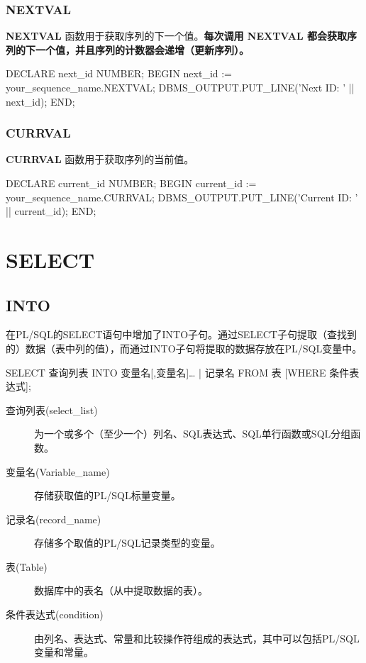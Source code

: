 \documentclass[11pt, a4paper, oneside, UTF8]{ctexbook}
\let\kaishu\relax %
\begin{document}
\subsection{NEXTVAL}
{\bfseries\kaishu NEXTVAL }函数用于获取序列的下一个值。{\bfseries\kaishu 每次调用 NEXTVAL 都会获取序列的下一个值，并且序列的计数器会递增（更新序列）。}
\begin{plsql}[caption=NEXTVAL示例代码]
DECLARE
  next_id NUMBER;
BEGIN
  next_id := your_sequence_name.NEXTVAL;
  DBMS_OUTPUT.PUT_LINE('Next ID: ' || next_id);
END;
\end{plsql}
\subsection{CURRVAL}
{\bfseries\kaishu CURRVAL} 函数用于获取序列的当前值。
\begin{plsql}[caption=CURRVAL示例代码]
DECLARE
  current_id NUMBER;
BEGIN
  current_id := your_sequence_name.CURRVAL;
  DBMS_OUTPUT.PUT_LINE('Current ID: ' || current_id);
END;
\end{plsql}
\chapter{SELECT}
\section{INTO}
在PL/SQL的SELECT语句中增加了INTO子句。通过SELECT子句提取（查找到的）数据（表中列的值），而通过INTO子句将提取的数据存放在PL/SQL变量中。

\begin{plsql}[caption=SELECT示例代码]
SELECT 查询列表
INTO {变量名[,变量名]… | 记录名}
FROM 表
[WHERE 条件表达式];
\end{plsql}
\begin{description}
  \item[查询列表(select\_list)] 为一个或多个（至少一个）列名、SQL表达式、SQL单行函数或SQL分组函数。
  \item[变量名(Variable\_name)] 存储获取值的PL/SQL标量变量。
  \item[记录名(record\_name)] 存储多个取值的PL/SQL记录类型的变量。
  \item[表(Table)] 数据库中的表名（从中提取数据的表）。
  \item[条件表达式(condition)] 由列名、表达式、常量和比较操作符组成的表达式，其中可以包括PL/SQL变量和常量。
\end{description}
\end{document}
